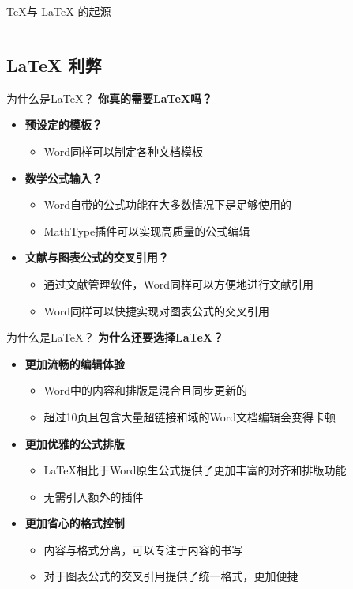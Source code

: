 \begin{frame}[fragile]{\TeX 与 \LaTeX{} 的起源}
\begin{columns}[T]
  \end{columns}
\end{frame}

\subsection{\LaTeX{} 利弊}

\begin{frame}[fragile]{为什么是\LaTeX{}？}
\textbf{你真的需要\LaTeX{}吗？}

\begin{itemize}
  \item \textbf{预设定的模板？}
  \begin{itemize}
    \item Word同样可以制定各种文档模板
  \end{itemize}
  \item \textbf{数学公式输入？}
  \begin{itemize}
    \item Word自带的公式功能在大多数情况下是足够使用的
    \item MathType插件可以实现高质量的公式编辑
  \end{itemize}
  \item \textbf{文献与图表公式的交叉引用？}
  \begin{itemize}
    \item 通过文献管理软件，Word同样可以方便地进行文献引用
    \item Word同样可以快捷实现对图表公式的交叉引用
  \end{itemize}
\end{itemize}

\end{frame}

\begin{frame}[fragile]{为什么是\LaTeX{}？}
  \textbf{为什么还要选择\LaTeX{}？}
  
  \begin{itemize}
    \item \textbf{更加流畅的编辑体验}
    \begin{itemize}
      \item Word中的内容和排版是混合且同步更新的
      \item 超过10页且包含大量超链接和域的Word文档编辑会变得卡顿
    \end{itemize}
    \item \textbf{更加优雅的公式排版}
    \begin{itemize}
      \item \LaTeX{}相比于Word原生公式提供了更加丰富的对齐和排版功能
      \item 无需引入额外的插件
    \end{itemize}
    \item \textbf{更加省心的格式控制}
    \begin{itemize}
      \item 内容与格式分离，可以专注于内容的书写
      \item 对于图表公式的交叉引用提供了统一格式，更加便捷
    \end{itemize}
  \end{itemize}
  \end{frame}

